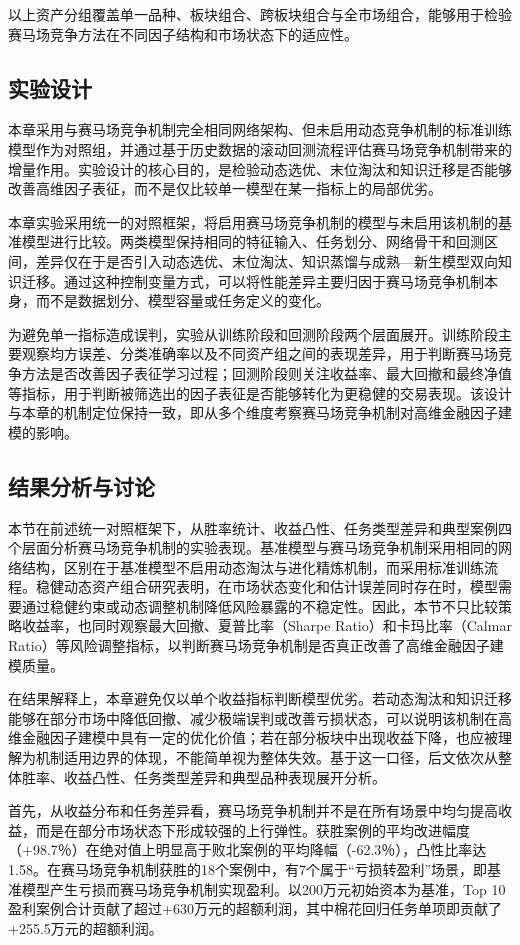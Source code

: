 以上资产分组覆盖单一品种、板块组合、跨板块组合与全市场组合，能够用于检验赛马场竞争方法在不同因子结构和市场状态下的适应性。

\subsection{实验设计}
本章采用与赛马场竞争机制完全相同网络架构、但未启用动态竞争机制的标准训练模型作为对照组，并通过基于历史数据的滚动回测流程评估赛马场竞争机制带来的增量作用。实验设计的核心目的，是检验动态选优、末位淘汰和知识迁移是否能够改善高维因子表征，而不是仅比较单一模型在某一指标上的局部优劣。

本章实验采用统一的对照框架，将启用赛马场竞争机制的模型与未启用该机制的基准模型进行比较。两类模型保持相同的特征输入、任务划分、网络骨干和回测区间，差异仅在于是否引入动态选优、末位淘汰、知识蒸馏与成熟—新生模型双向知识迁移。通过这种控制变量方式，可以将性能差异主要归因于赛马场竞争机制本身，而不是数据划分、模型容量或任务定义的变化。

为避免单一指标造成误判，实验从训练阶段和回测阶段两个层面展开。训练阶段主要观察均方误差、分类准确率以及不同资产组之间的表现差异，用于判断赛马场竞争方法是否改善因子表征学习过程；回测阶段则关注收益率、最大回撤和最终净值等指标，用于判断被筛选出的因子表征是否能够转化为更稳健的交易表现。该设计与本章的机制定位保持一致，即从多个维度考察赛马场竞争机制对高维金融因子建模的影响。

\subsection{结果分析与讨论}
本节在前述统一对照框架下，从胜率统计、收益凸性、任务类型差异和典型案例四个层面分析赛马场竞争机制的实验表现。基准模型与赛马场竞争机制采用相同的网络结构，区别在于基准模型不启用动态淘汰与进化精炼机制，而采用标准训练流程。稳健动态资产组合研究表明，在市场状态变化和估计误差同时存在时，模型需要通过稳健约束或动态调整机制降低风险暴露的不稳定性\cite{zhu2007robust}。因此，本节不只比较策略收益率，也同时观察最大回撤、夏普比率（Sharpe Ratio）和卡玛比率（Calmar Ratio）等风险调整指标，以判断赛马场竞争机制是否真正改善了高维金融因子建模质量。

在结果解释上，本章避免仅以单个收益指标判断模型优劣。若动态淘汰和知识迁移能够在部分市场中降低回撤、减少极端误判或改善亏损状态，可以说明该机制在高维金融因子建模中具有一定的优化价值；若在部分板块中出现收益下降，也应被理解为机制适用边界的体现，不能简单视为整体失效。基于这一口径，后文依次从整体胜率、收益凸性、任务类型差异和典型品种表现展开分析。

首先，从收益分布和任务差异看，赛马场竞争机制并不是在所有场景中均匀提高收益，而是在部分市场状态下形成较强的上行弹性。获胜案例的平均改进幅度（+98.7％）在绝对值上明显高于败北案例的平均降幅（-62.3％），凸性比率达1.58。在赛马场竞争机制获胜的18个案例中，有7个属于“亏损转盈利”场景，即基准模型产生亏损而赛马场竞争机制实现盈利。以200万元初始资本为基准，Top 10盈利案例合计贡献了超过+630万元的超额利润，其中棉花回归任务单项即贡献了+255.5万元的超额利润。

